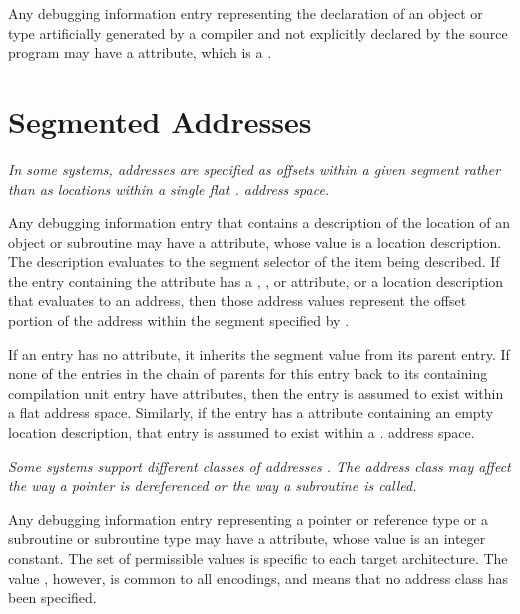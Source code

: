 Any debugging information entry representing the
declaration of an object or type artificially generated by
a compiler and not explicitly declared by the source program
\hypertarget{chap:DWATartificialobjectsortypesthat}{}
may have a 
\DWATartificial{} attribute, 
which is a .

\section{Segmented Addresses}
\label{chap:segmentedaddresses}
\textit{In some systems, addresses are specified as offsets within a
given 
segment 
rather than as locations within a single flat
.
address space.}

Any debugging information entry that contains a description
\hypertarget{chap:DWATsegmentaddressinginformation}{}
of the location of an object or subroutine may have
a 
\DWATsegment{} attribute, 
whose value is a location
description. The description evaluates to the segment selector
of the item being described. If the entry containing the
\DWATsegment{} attribute has a 
\DWATlowpc, 
\DWAThighpc,
\DWATranges{} or 
\DWATentrypc{} attribute, 
or 
a location
description that evaluates to an address, then those address
values represent the offset portion of the address within
the segment specified 
by \DWATsegment.

If an entry has no 
\DWATsegment{} attribute, it inherits
the segment value from its parent entry.  If none of the
entries in the chain of parents for this entry back to
its containing compilation unit entry have 
\DWATsegment{} attributes, 
then the entry is assumed to exist within a flat
address space. 
Similarly, if the entry has a 
\DWATsegment{} attribute 
containing an empty location description, that
entry is assumed to exist within a 
.
address space.

\textit{Some systems support different classes of 
addresses
. 
The
address class may affect the way a pointer is dereferenced
or the way a subroutine is called.}


Any debugging information entry representing a pointer or
reference type or a subroutine or subroutine type may 
have a 
\DWATaddressclass{}
attribute, whose value is an integer
constant.  The set of permissible values is specific to
each target architecture. The value \DWADDRnoneTARG, 
however,
is common to all encodings, and means that no address class
has been specified.

